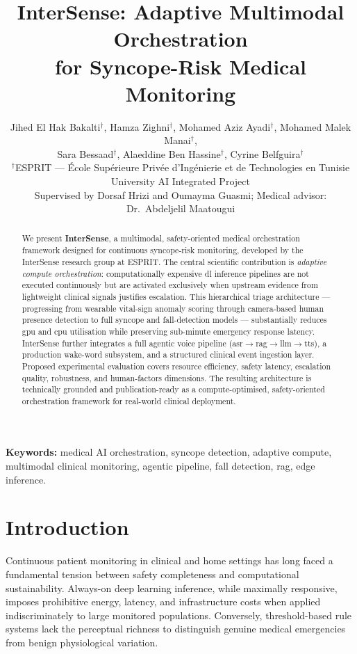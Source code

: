 \documentclass[10pt,twocolumn,a4paper]{article}
\title{%
  \vspace{-6mm}%
  {\Large\bfseries InterSense: Adaptive Multimodal Orchestration\\
   for Syncope-Risk Medical Monitoring}%
  \vspace{1mm}%
}
\author{%
  \normalsize
  Jihed El Hak Bakalti$^{\dagger}$,\;
  Hamza Zighni$^{\dagger}$,\;
  Mohamed Aziz Ayadi$^{\dagger}$,\;
  Mohamed Malek Manai$^{\dagger}$,\\[2pt]
  Sara Bessaad$^{\dagger}$,\;
  Alaeddine Ben Hassine$^{\dagger}$,\;
  Cyrine Belfguira$^{\dagger}$\\[4pt]
  \small$^{\dagger}$ESPRIT — École Supérieure Privée d'Ingénierie
  et de Technologies en Tunisie\\
  \small University AI Integrated Project\\[2pt]
  \small Supervised by Dorsaf Hrizi and Oumayma Guasmi;
         Medical advisor: Dr.\ Abdeljelil Maatougui
}
\date{}   %
\begin{document}
\maketitle
\thispagestyle{fancy}

\begin{abstract}
We present \textbf{InterSense}, a multimodal, safety-oriented
medical orchestration framework designed for continuous
\gls{syncope}-risk monitoring, developed by the InterSense research
group at ESPRIT. The central scientific contribution is
\emph{adaptive compute orchestration}: computationally expensive
\gls{dl} inference pipelines are not executed continuously but are
activated exclusively when upstream evidence from lightweight clinical
signals justifies \gls{escalation}. This hierarchical triage
architecture — progressing from wearable vital-sign anomaly scoring
through camera-based human presence detection to full syncope and
fall-detection models — substantially reduces \gls{gpu} and \gls{cpu}
utilisation while preserving sub-minute emergency response latency.
InterSense further integrates a full agentic voice pipeline
(\gls{asr}$\rightarrow$\gls{rag}$\rightarrow$\gls{llm}$\rightarrow$\gls{tts}),
a production wake-word subsystem, and a structured clinical event
ingestion layer. Proposed experimental evaluation covers resource
efficiency, safety latency, escalation quality, robustness, and
human-factors dimensions. The resulting architecture is technically
grounded and publication-ready as a compute-optimised, safety-oriented
orchestration framework for real-world clinical deployment.
\end{abstract}

\smallskip
\noindent\textbf{Keywords:} medical AI orchestration, syncope
detection, adaptive compute, multimodal clinical monitoring, agentic
pipeline, fall detection, \gls{rag}, edge inference.

\section{Introduction}

Continuous patient monitoring in clinical and home settings has long
faced a fundamental tension between safety completeness and
computational sustainability. Always-on deep learning inference, while
maximally responsive, imposes prohibitive energy, latency, and
infrastructure costs when applied indiscriminately to large monitored
populations. Conversely, threshold-based rule systems lack the
perceptual richness to distinguish genuine medical emergencies from
benign physiological variation.
\end{document}
